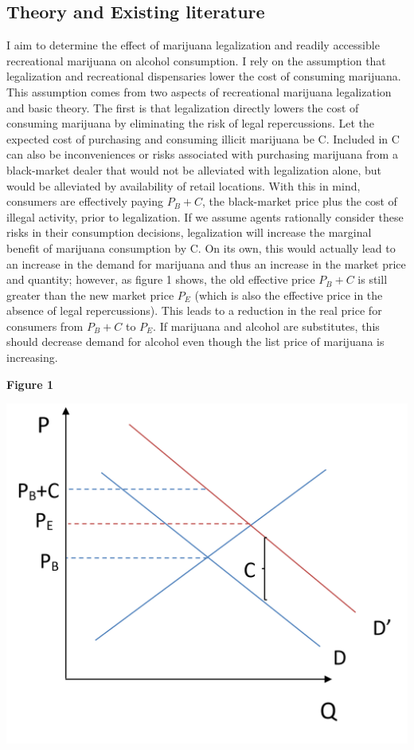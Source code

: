 \documentclass[11pt]{article}
\begin{document}
\subsection{Theory and Existing literature}

I aim to determine the effect of marijuana legalization and readily accessible recreational marijuana on alcohol consumption. I rely on the assumption that legalization and recreational dispensaries lower the cost of consuming marijuana. This assumption comes from two aspects of recreational marijuana legalization and basic theory. The first is that legalization directly lowers the cost of consuming marijuana by eliminating the risk of legal repercussions. Let the expected cost of purchasing and consuming illicit marijuana be C. Included in C can also be inconveniences or risks associated with purchasing marijuana from a black-market dealer that would not be alleviated with legalization alone, but would be alleviated by availability of retail locations. With this in mind, consumers are effectively paying $P_B + C$, the black-market price plus the cost of illegal activity, prior to legalization. If we assume agents rationally consider these risks in their consumption decisions, legalization will increase the marginal benefit of marijuana consumption by C. On its own, this would actually lead to an increase in the demand for marijuana and thus an increase in the market price and quantity; however, as figure 1 shows, the old effective price $ P_B + C$ is still greater than the new market price $P_E$ (which is also the effective price in the absence of legal repercussions). This leads to a reduction in the real price for consumers from $ P_B + C$ to $P_E$. If marijuana and alcohol are substitutes, this should decrease demand for alcohol even though the list price of marijuana is increasing.\par
\begin{center}
		\centering
	
	\textbf{Figure 1}\par\medskip
	
	\includegraphics[width=.5\linewidth]{legal_dside.png}
	
\end{center}
\end{document}
